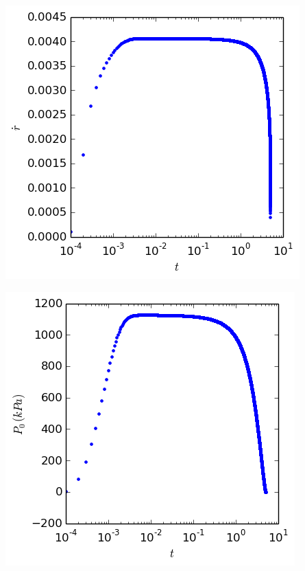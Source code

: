 \documentclass[cleanfoot,cleanhead,twocolumn,10pt,notitlepage]{asme2e}
\begin{document}
\includegraphics[width=\linewidth]{../python_stuff/Part2/r_dot.png}

\includegraphics[width=\linewidth]{../python_stuff/Part2/P0.png}
\end{document}
